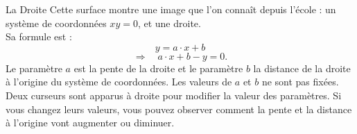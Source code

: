 \begin{surferPage}[Droite]{La Droite}   
Cette surface montre une image que l'on connaît depuis l'école : un système de coordonnées $xy=0$, et une droite. \\Sa formule est :
\[y=a\cdot x + b\]
\[ \Rightarrow \quad a\cdot x +b -y=0.\]
Le paramètre $a$ est la pente de la droite et le paramètre $b$ la distance de la droite à l'origine du système de coordonnées.
\newline \newline
Les valeurs de $a$ et $b$ ne sont pas fixées. Deux curseurs sont apparus à droite pour modifier la valeur des paramètres. Si vous changez leurs valeurs, vous pouvez observer comment la pente et la distance à l'origine vont augmenter ou diminuer.
\end{surferPage}
